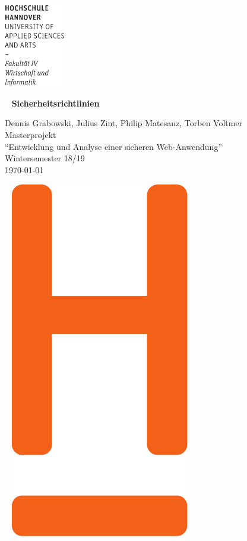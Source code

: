 \documentclass[fontsize=12pt,DIV=14,BCOR=10mm,a4paper,parskip=half-,ngerman,english,bibliography=totocnumbered]{scrreprt}
\begin{document}
  \thispagestyle{empty} %
\includegraphics[width=0.2\textwidth]{Wortmarke_WI_schwarz}

   {  ~ \sffamily
  \vfill
  {\Huge\bfseries Sicherheitsrichtlinien}
  \bigskip

  {\Large
  Dennis Grabowski, Julius Zint, Philip Matesanz, Torben Voltmer \\[2ex]
  Masterprojekt \\
  \enquote{Entwicklung und Analyse einer sicheren Web-Anwendung} \\
  Wintersemester 18/19\makeatletter
  \patchcmd{\scr@startchapter}{\if@openright\cleardoublepage\else\clearpage\fi}{}{}{}
  \makeatother
 \\[5ex]
   \today }
}
 \vfill

  ~ \hfill
  \includegraphics[height=0.3\paperheight]{H_WI_Pantone1665}
\end{document}
